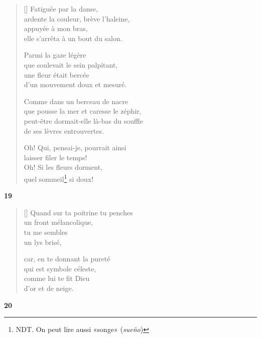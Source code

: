 \documentclass[a4paper,12pt]{book}
\begin{document}
\settowidth{\versewidth}{que pousse la mer et caresse le zéphir,}

\begin{verse}[\versewidth]
  Fatiguée par la danse, \\
  ardente la couleur, brève l'haleine, \\
  appuyée à mon bras, \\
  elle s'arrêta à un bout du salon.

  Parmi la gaze légère \\
  que soulevait le sein palpitant, \\
  une fleur était bercée \\
  d'un mouvement doux et mesuré.

  Comme dans un berceau de nacre \\
  que pousse la mer et caresse le zéphir, \\
  peut-être dormait-elle là-bas du souffle \\
  de ses lèvres entrouvertes.

  Oh! Qui, pensai-je, pourrait ainsi \\
  laisser filer le temps! \\
  Oh! Si les fleurs dorment, \\
  quel sommeil\footnote{NDT. On peut lire aussi «songe» (\emph{sueño})} si doux!
\end{verse}

\bigskip

\begin{center}
  \textbf{19}
\end{center}

\settowidth{\versewidth}{Quand sur ta poitrine tu penches}

\begin{verse}[\versewidth]
  Quand sur ta poitrine tu penches \\
  un front mélancolique, \\
  tu me sembles \\
  un lys brisé,

  car, en te donnant la pureté \\
  qui est symbole céleste, \\
  comme lui te fit Dieu \\
  d'or et de neige.
\end{verse}

\bigskip

\begin{center}
  \textbf{20}
\end{center}
\end{document}
